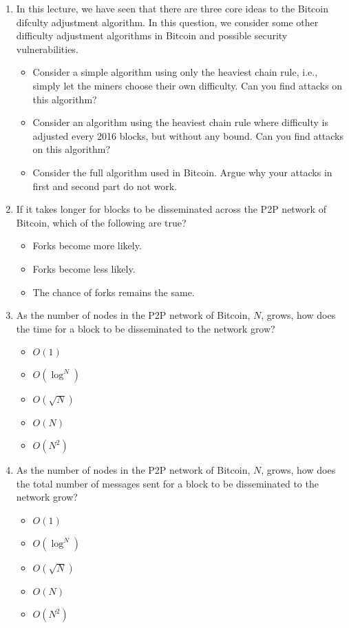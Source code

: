 \documentclass{report}
\begin{document}
\begin{enumerate}
	\item In this lecture, we have seen that there are three core ideas to the Bitcoin difculty adjustment algorithm. In this question, we consider some other difficulty adjustment algorithms in Bitcoin and possible security vulnerabilities.
	\begin{itemize}
		\item Consider a simple algorithm using only the heaviest chain rule, i.e., simply let the miners choose their own difficulty. Can you find attacks on this algorithm?
		\item Consider an algorithm using the heaviest chain rule where difficulty is adjusted every 2016 blocks, but without any bound. Can you find attacks on this algorithm?
		\item Consider the full algorithm used in Bitcoin. Argue why your attacks in first and second part do not work.
	\end{itemize}
	\item If it takes longer for blocks to be disseminated across the P2P network of Bitcoin, which of the following are true?
	\begin{itemize}
		\item Forks become more likely.
		\item Forks become less likely.
		\item The chance of forks remains the same.
	\end{itemize}
	\item As the number of nodes in the P2P network of Bitcoin, $N$, grows, how does the time for a block to be disseminated to the network grow?
	\begin{itemize}
		\item $O(1)$
		\item $O(\log^{N})$
		\item $O(\sqrt{N})$
		\item $O(N)$
		\item $O(N^{2})$
	\end{itemize}
	\item As the number of nodes in the P2P network of Bitcoin, $N$, grows, how does the total number of messages sent for a block to be disseminated to the network grow?
	\begin{itemize}
		\item $O(1)$
		\item $O(\log^{N})$
		\item $O(\sqrt{N})$
		\item $O(N)$
		\item $O(N^{2})$

\end{itemize}
\end{enumerate}
\end{document}

